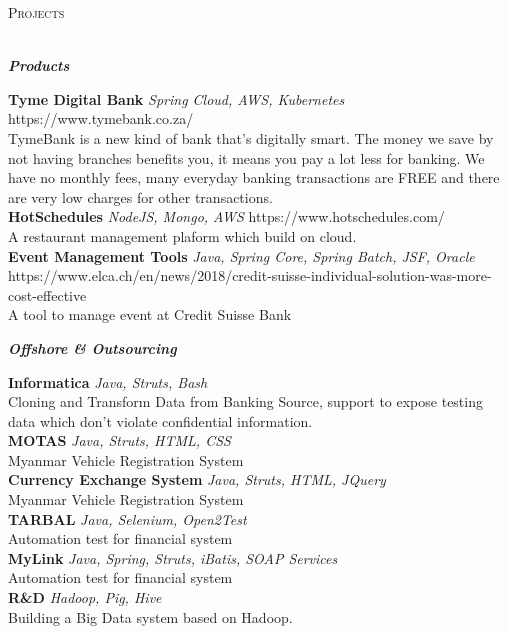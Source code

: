 \documentclass[a4paper]{article}
\newcommand{\lineunder} {
    \vspace*{-8pt} \\
    \hspace*{-18pt} \hrulefill \\
}
\newcommand{\header} [1] {
    {\hspace*{-18pt}\vspace*{6pt} \textsc{#1}}
    \vspace*{-6pt} \lineunder
}
\begin{document}
\header{Projects}
\begin{center}
	\textbf{\textit{Products}}
\end{center}

{\textbf{Tyme Digital Bank}} {\sl Spring Cloud, AWS, Kubernetes} \hfill https://www.tymebank.co.za/\\
TymeBank is a new kind of bank that’s digitally smart. The money we save by not having branches benefits you, it means you pay a lot less for banking. We have no monthly fees, many everyday banking transactions are FREE and there are very low charges for other transactions.\\
\vspace*{2mm}
{\textbf{HotSchedules}} {\sl NodeJS, Mongo, AWS} \hfill https://www.hotschedules.com/\\
A restaurant management plaform which build on cloud.\\
\vspace*{2mm}
{\textbf{Event Management Tools}} {\sl Java, Spring Core, Spring Batch, JSF, Oracle} \hfill https://www.elca.ch/en/news/2018/credit-suisse-individual-solution-was-more-cost-effective\\
A tool to manage event at Credit Suisse Bank\\
\vspace*{2mm}

\begin{center}
	\textbf{\textit{Offshore \& Outsourcing}}
\end{center}

{\textbf{Informatica}} {\sl Java, Struts, Bash}\\
Cloning and Transform Data from Banking Source, support to expose testing data which don't violate confidential information.\\
\vspace*{2mm}
{\textbf{MOTAS}} {\sl Java, Struts, HTML, CSS}\\
Myanmar Vehicle Registration System\\
\vspace*{2mm}
{\textbf{Currency Exchange System}} {\sl Java, Struts, HTML, JQuery}\\
Myanmar Vehicle Registration System\\
\vspace*{2mm}
{\textbf{TARBAL}} {\sl Java, Selenium, Open2Test}\\
Automation test for financial system\\
\vspace*{2mm}
{\textbf{MyLink}} {\sl Java, Spring, Struts, iBatis, SOAP Services}\\
Automation test for financial system\\
\vspace*{2mm}
{\textbf{R\&D}} {\sl Hadoop, Pig, Hive}\\
Building a Big Data system based on Hadoop.\\
\vspace*{2mm}

\ 
\end{document}
